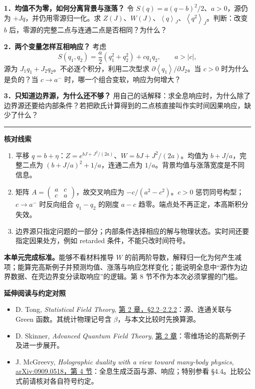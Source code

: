\documentclass[11pt,a4paper]{article}
\newcommand{\avg}[1]{\left\langle #1\right\rangle}
\begin{document}
\textbf{1．均值不为零，如何分离背景与涨落？}
令 \(S(q)=a(q-b)^2/2\)、\(a>0\)，源仍为 \(+Jq\)，并仍用零源归一化。求 \(Z(J)\)、\(W(J)\)、\(\avg q_J\)、\(\avg{q^2}_J\)。判断：改变 \(b\) 后，零源的完整二点与连通二点是否相同？为什么？

\textbf{2．两个变量怎样互相响应？}
考虑
\begin{equation}
 S(q_1,q_2)=\frac a2(q_1^2+q_2^2)+c q_1q_2,
 \qquad a>|c|,
\end{equation}
源为 \(J_1q_1+J_2q_2\)。不必逐个积分，利用二次型求
\(\partial\avg{q_1}/\partial J_2\)。当 \(c>0\) 时为什么是负的？当 \(c\to a^-\) 时，哪一个组合变软，响应为何增大？

\textbf{3．只知道边界源，为什么还不够？}
用自己的话解释：求全息响应时，为什么除了边界源还要给内部条件？若把欧氏计算得到的二点核直接叫作实时间因果响应，缺少了什么？

\medskip\hrule\medskip
\textbf{核对线索}
\begin{enumerate}
\item 平移 \(q=b+\eta\)：\(Z=e^{bJ+J^2/(2a)}\)、\(W=bJ+J^2/(2a)\)。均值为 \(b+J/a\)，完整二点为 \((b+J/a)^2+1/a\)，连通二点为 \(1/a\)。背景均值与涨落宽度是不同信息。
\item 矩阵 \(A=\left(\begin{smallmatrix}a&c\\c&a\end{smallmatrix}\right)\)，故交叉响应为
\(-c/(a^2-c^2)\)。\(c>0\) 惩罚同号构型；\(c\to a^-\) 时反向组合 \(q_1-q_2\) 的刚度 \(a-c\) 趋零。端点处不再正定，本高斯积分失效。
\item 边界源只指定问题的一部分；内部条件选择相应的解与物理状态。实时间还要指定因果处方，例如 retarded 条件，不能只改时间符号。
\end{enumerate}

\textbf{本单元完成标准。}能够不看材料推导 \(W\) 的前两阶导数，解释归一化为何产生减项；能算完高斯例子并预测均值、涨落与响应怎样变化；能说明全息中“源作为边界数据、在壳边界变分读取响应”的逻辑。第 8 节不作为本次必须掌握的门槛。

\textbf{延伸阅读与约定对照}
\begin{itemize}
\item D. Tong, \textit{Statistical Field Theory}, \href{https://davidtong.org/teaching/statistical-field-theory/sfthtml/S2}{第 2 章，\S2.2--2.2.2}：源、连通关联与 Green 函数。其统计物理记号含 \(\beta\)，与本文比较时先换算源。
\item D. Skinner, \textit{Advanced Quantum Field Theory}, \href{https://www.damtp.cam.ac.uk/user/dbs26/AQFT/chap2.pdf}{第 2 章}：零维场论的高斯例子及进一步展开。
\item J. McGreevy, \textit{Holographic duality with a view toward many-body physics}, \href{https://arxiv.org/abs/0909.0518}{arXiv:0909.0518，第 4 节}：全息生成泛函与源、响应；特别参看 \S4.4。比较公式前请核对各自符号约定。
\end{itemize}
\end{document}
